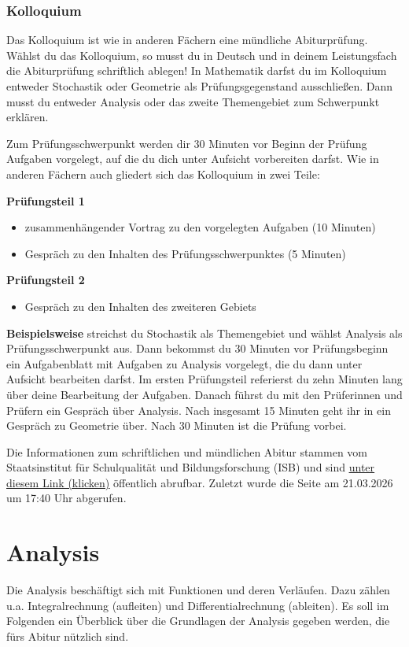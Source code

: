 \documentclass[ngerman, 12pt]{nssheetxea}
\begin{document}
\subsubsection*{Kolloquium}
Das Kolloquium ist wie in anderen Fächern eine mündliche Abiturprüfung. Wählst du das Kolloquium, so musst du in Deutsch und in deinem Leistungsfach die Abiturprüfung schriftlich ablegen! In Mathematik darfst du im Kolloquium entweder Stochastik oder Geometrie als Prüfungsgegenstand ausschließen. Dann musst du entweder Analysis oder das zweite Themengebiet zum Schwerpunkt erklären. \par
Zum Prüfungsschwerpunkt werden dir 30 Minuten vor Beginn der Prüfung Aufgaben vorgelegt, auf die du dich unter Aufsicht vorbereiten darfst. Wie in anderen Fächern auch gliedert sich das Kolloquium in zwei Teile: \par
\textbf{Prüfungsteil 1}
\begin{itemize}
\item zusammenhängender Vortrag zu den vorgelegten Aufgaben (10 Minuten)
\item Gespräch zu den Inhalten des Prüfungsschwerpunktes (5 Minuten)
\end{itemize}
\textbf{Prüfungsteil 2}
\begin{itemize}
\item Gespräch zu den Inhalten des zweiteren Gebiets
\end{itemize}
\textbf{Beispielsweise} streichst du Stochastik als Themengebiet und wählst Analysis als Prüfungsschwerpunkt aus. Dann bekommst du 30 Minuten vor Prüfungsbeginn ein Aufgabenblatt mit Aufgaben zu Analysis vorgelegt, die du dann unter Aufsicht bearbeiten darfst. Im ersten Prüfungsteil referierst du zehn Minuten lang über deine Bearbeitung der Aufgaben. Danach führst du mit den Prüferinnen und Prüfern ein Gespräch über Analysis. Nach insgesamt 15 Minuten geht ihr in ein Gespräch zu Geometrie über. Nach 30 Minuten ist die Prüfung vorbei. \par
Die Informationen zum schriftlichen und mündlichen Abitur stammen vom Staatsinstitut für Schulqualität und Bildungsforschung (ISB) und sind \uline{\href{https://www.isb.bayern.de/fileadmin/user_upload/Gymnasium/IlluPA/M/IlluPA_Mathematik_Uebersicht.pdf}{unter diesem Link (klicken)}} öffentlich abrufbar. Zuletzt wurde die Seite am 21.03.2026 um 17:40 Uhr abgerufen. 


\newpage
\tableofcontents

\newpage
\pagestyle{skript}
\section{Analysis}
Die Analysis beschäftigt sich mit Funktionen und deren Verläufen. Dazu zählen u.a.  Integralrechnung (\glqq aufleiten\grqq) und Differentialrechnung (\glqq ableiten\grqq). Es soll im Folgenden ein Überblick über die Grundlagen der Analysis gegeben werden, die fürs Abitur nützlich sind.
\end{document}
